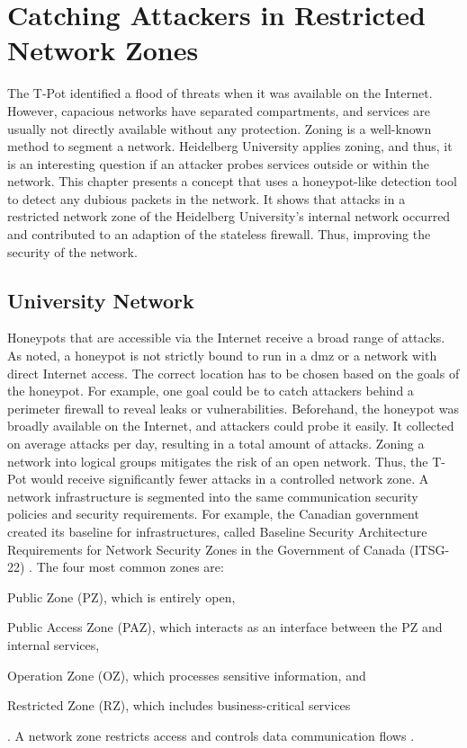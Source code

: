 \chapter{Catching Attackers in Restricted Network Zones}
\label{chap:concept}

The T-Pot identified a flood of threats when it was available on the Internet.
However, capacious networks have separated compartments, and services are usually not directly available without any protection.
Zoning is a well-known method to segment a network.
Heidelberg University applies zoning, and thus, it is an interesting question if an attacker probes services outside or within the network.
This chapter presents a concept that uses a honeypot-like detection tool to detect any dubious packets in the network.
It shows that attacks in a restricted network zone of the Heidelberg University's internal network occurred and contributed to an adaption of the stateless firewall.
Thus, improving the security of the network.

\section{University Network}

Honeypots that are accessible via the Internet receive a broad range of attacks.
As \citet{Spitzner2003} noted, a honeypot is not strictly bound to run in a \ac{dmz} or a network with direct Internet access.
The correct location has to be chosen based on the goals of the honeypot.
For example, one goal could be to catch attackers behind a perimeter firewall to reveal leaks or vulnerabilities.
Beforehand, the honeypot was broadly available on the Internet, and attackers could probe it easily.
It collected on average  attacks per day, resulting in a total amount of  attacks.
Zoning a network into logical groups mitigates the risk of an open network.
Thus, the T-Pot would receive significantly fewer attacks in a controlled network zone.
A network infrastructure is segmented into the same communication security policies and security requirements.
For example, the Canadian government created its baseline for infrastructures, called Baseline Security Architecture Requirements for Network Security Zones in the Government of Canada (ITSG-22) \cite{csec2021}.
The four most common zones are:
\begin{enumerate*}[label=(\roman*)]
    \item Public Zone (PZ), which is entirely open,
    \item Public Access Zone (PAZ), which interacts as an interface between the PZ and internal services,
    \item Operation Zone (OZ), which processes sensitive information, and
    \item Restricted Zone (RZ), which includes business-critical services
\end{enumerate*} \cite{csec2021}.
A network zone restricts access and controls data communication flows \cite{csec2021}.

